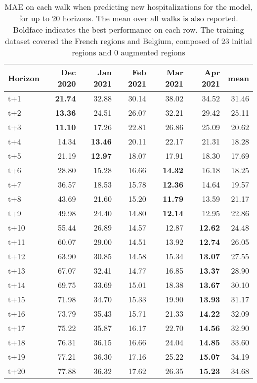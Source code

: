 \begin{table}[H]
\centering
\caption{MAE on each walk when predicting new hospitalizations for the model, for up to 20 horizons. The mean over all walks is also reported. Boldface indicates the best performance on each row. The training dataset covered the French regions and Belgium, composed of 23 initial regions and 0 augmented regions }
\label{tab:MAE_walk_encoder_decoder}
\begin{tabular}{lrrrrrr}
\toprule
Horizon &  Dec 2020 &  Jan 2021 &  Feb 2021 &  Mar 2021 &  Apr 2021 &  mean \\
\midrule
t+1  & \textbf{21.74}  & 32.88  & 30.14  & 38.02  & 34.52  & 31.46  \\
t+2  & \textbf{13.36}  & 24.51  & 26.07  & 32.21  & 29.42  & 25.11  \\
t+3  & \textbf{11.10}  & 17.26  & 22.81  & 26.86  & 25.09  & 20.62  \\
t+4  & 14.34  & \textbf{13.46}  & 20.11  & 22.17  & 21.31  & 18.28  \\
t+5  & 21.19  & \textbf{12.97}  & 18.07  & 17.91  & 18.30  & 17.69  \\
t+6  & 28.80  & 15.28  & 16.66  & \textbf{14.32}  & 16.18  & 18.25  \\
t+7  & 36.57  & 18.53  & 15.78  & \textbf{12.36}  & 14.64  & 19.57  \\
t+8  & 43.69  & 21.60  & 15.20  & \textbf{11.79}  & 13.59  & 21.17  \\
t+9  & 49.98  & 24.40  & 14.80  & \textbf{12.14}  & 12.95  & 22.86  \\
t+10  & 55.44  & 26.89  & 14.57  & 12.87  & \textbf{12.62}  & 24.48  \\
t+11  & 60.07  & 29.00  & 14.51  & 13.92  & \textbf{12.74}  & 26.05  \\
t+12  & 63.90  & 30.85  & 14.58  & 15.34  & \textbf{13.07}  & 27.55  \\
t+13  & 67.07  & 32.41  & 14.77  & 16.85  & \textbf{13.37}  & 28.90  \\
t+14  & 69.75  & 33.69  & 15.01  & 18.38  & \textbf{13.67}  & 30.10  \\
t+15  & 71.98  & 34.70  & 15.33  & 19.90  & \textbf{13.93}  & 31.17  \\
t+16  & 73.79  & 35.43  & 15.71  & 21.33  & \textbf{14.22}  & 32.09  \\
t+17  & 75.22  & 35.87  & 16.17  & 22.70  & \textbf{14.56}  & 32.90  \\
t+18  & 76.31  & 36.15  & 16.66  & 24.04  & \textbf{14.85}  & 33.60  \\
t+19  & 77.21  & 36.30  & 17.16  & 25.22  & \textbf{15.07}  & 34.19  \\
t+20  & 77.88  & 36.32  & 17.62  & 26.35  & \textbf{15.23}  & 34.68  \\

\bottomrule
\end{tabular}
\end{table}
